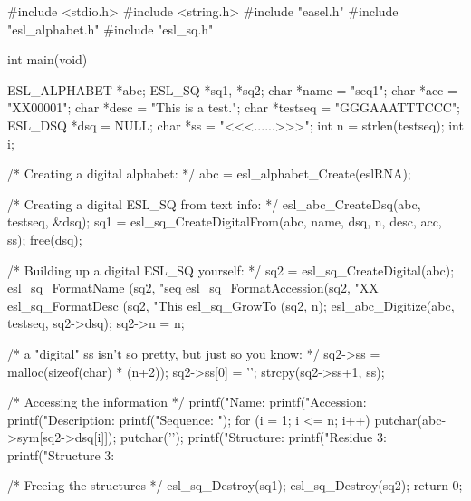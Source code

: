 \begin{cchunk}
#include <stdio.h>
#include <string.h>
#include "easel.h"
#include "esl_alphabet.h"
#include "esl_sq.h"

int main(void)
{
  ESL_ALPHABET *abc;
  ESL_SQ       *sq1, *sq2;
  char         *name    = "seq1";
  char         *acc     = "XX00001";
  char         *desc    = "This is a test.";
  char         *testseq = "GGGAAATTTCCC";
  ESL_DSQ      *dsq     = NULL;
  char         *ss      = "<<<......>>>";
  int           n       = strlen(testseq);
  int           i;

  /* Creating a digital alphabet: */
  abc = esl_alphabet_Create(eslRNA);

  /* Creating a digital ESL_SQ from text info: */
  esl_abc_CreateDsq(abc, testseq, &dsq);
  sq1 = esl_sq_CreateDigitalFrom(abc, name, dsq, n, desc, acc, ss); 
  free(dsq);
  
  /* Building up a digital ESL_SQ yourself: */
  sq2 = esl_sq_CreateDigital(abc);
  esl_sq_FormatName     (sq2, "seq%
  esl_sq_FormatAccession(sq2, "XX%
  esl_sq_FormatDesc     (sq2, "This %
  esl_sq_GrowTo         (sq2, n);
  esl_abc_Digitize(abc, testseq, sq2->dsq);
  sq2->n = n;

  /* a "digital" ss isn't so pretty, but just so you know: */
  sq2->ss    = malloc(sizeof(char) * (n+2));
  sq2->ss[0] = '\0';
  strcpy(sq2->ss+1, ss); 

  /* Accessing the information */
  printf("Name:        %
  printf("Accession:   %
  printf("Description: %
  printf("Sequence:    "); 
  for (i = 1; i <= n; i++) 
    putchar(abc->sym[sq2->dsq[i]]);
  putchar('\n');
  printf("Structure:   %
  printf("Residue 3:   %
  printf("Structure 3: %
  
  /* Freeing the structures */
  esl_sq_Destroy(sq1);
  esl_sq_Destroy(sq2);
  return 0;
}
\end{cchunk}
